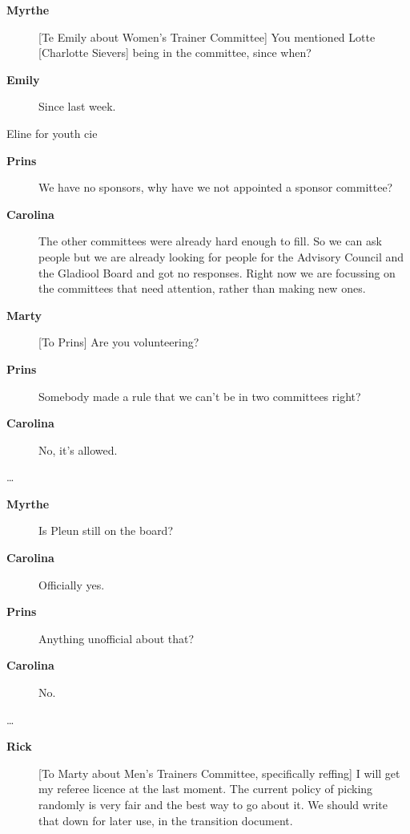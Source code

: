 \documentclass[12pt, a4paper]{article}
\newcommand{\speak}[2]{\begin{description}\item[\textbf{#1}]#2\end{description}}
\begin{document}




\speak{Myrthe}{[Te Emily about Women's Trainer Committee] You mentioned Lotte [Charlotte Sievers] being in the committee, since when?}

\speak{Emily}{Since last week.}


Eline for youth cie

\speak{Prins}{We have no sponsors, why have we not appointed a sponsor committee?}

\speak{Carolina}{The other committees were already hard enough to fill. So we can ask people but we are already looking for people for the Advisory Council and the Gladiool Board and got no responses. Right now we are focussing on the committees that need attention, rather than making new ones.}

\speak{Marty}{[To Prins] Are you volunteering?}

\speak{Prins}{Somebody made a rule that we can't be in two committees right?}

\speak{Carolina}{No, it's allowed.}


\dots

\speak{Myrthe}{Is Pleun still on the board?}

\speak{Carolina}{Officially yes.}

\speak{Prins}{Anything unofficial about that?}

\speak{Carolina}{No.}



\dots

\speak{Rick}{[To Marty about Men's Trainers Committee, specifically reffing] I will get my referee licence at the last moment. The current policy of picking randomly is very fair and the best way to go about it. We should write that down for later use, in the transition document.}
\end{document}
